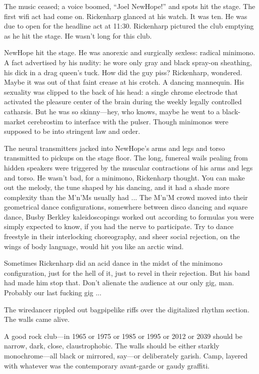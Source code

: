 The music ceased; a voice boomed, ``Joel NewHope!'' and spots hit the stage. The first wifi act had come on. Rickenharp glanced at his watch. It was ten. He was due to open for the headline act at 11:30. Rickenharp pictured the club emptying as he hit the stage. He wasn't long for this club.

NewHope hit the stage. He was anorexic and surgically sexless: radical minimono. A fact advertised by his nudity: he wore only gray and black spray-on sheathing, his dick in a drag queen's tuck. How did the guy piss? Rickenharp, wondered. Maybe it was out of that faint crease at his crotch. A dancing mannequin. His sexuality was clipped to the back of his head: a single chrome electrode that activated the pleasure center of the brain during the weekly legally controlled catharsis. But he was so skinny—hey, who knows, maybe he went to a black-market cerebrostim to interface with the pulser. Though minimonos were supposed to be into stringent law and order.

The neural transmitters jacked into NewHope's arms and legs and torso transmitted to pickups on the stage floor. The long, funereal wails pealing from hidden speakers were triggered by the muscular contractions of his arms and legs and torso. He wasn't bad, for a minimono, Rickenharp thought. You can make out the melody, the tune shaped by his dancing, and it had a shade more complexity than the M'n'Ms usually had ... The M'n'M crowd moved into their geometrical dance configurations, somewhere between disco dancing and square dance, Busby Berkley kaleidoscopings worked out according to formulas you were simply expected to know, if you had the nerve to participate. Try to dance freestyle in their interlocking choreography, and sheer social rejection, on the wings of body language, would hit you like an arctic wind.

Sometimes Rickenharp did an acid dance in the midst of the minimono configuration, just for the hell of it, just to revel in their rejection. But his band had made him stop that. Don't alienate the audience at our only gig, man. Probably our last fucking gig ...

The wiredancer rippled out bagpipelike riffs over the digitalized rhythm section. The walls came alive.

A good rock club—in 1965 or 1975 or 1985 or 1995 or 2012 or 2039 should be narrow, dark, close, claustrophobic. The walls should be either starkly monochrome—all black or mirrored, say—or deliberately garish. Camp, layered with whatever was the contemporary avant-garde or gaudy graffiti.

